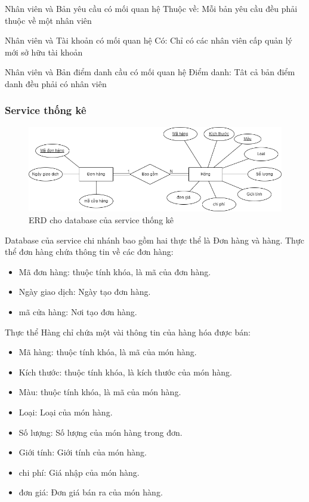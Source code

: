 Nhân viên và Bản yêu cầu có mối quan hệ Thuộc về: Mỗi bản yêu cầu đều phải thuộc về một nhân viên

Nhân viên và Tài khoản có mối quan hệ Có: Chỉ có các nhân viên cấp quản lý mới sở hữu tài khoản

Nhân viên và Bản điểm danh cầu có mối quan hệ Điểm danh: Tât cả bản điểm danh đều phải có nhân viên


\subsubsection{Service thống kê}
\begin{figure}[!htp]
	\begin{center}
		\includegraphics[width=12cm]{img/database/erd/Statistic.png}
		\newline
		\caption{ERD cho database của service thống kê}
	\end{center}
\end{figure}

Database của service chi nhánh bao gồm hai thực thể là Đơn hàng và hàng. Thực thể đơn hàng chứa thông tin về các đơn hàng:
\begin{itemize}
	\item Mã đơn hàng: thuộc tính khóa, là mã của đơn hàng.
	\item Ngày giao dịch: Ngày tạo đơn hàng.
	\item mã cửa hàng: Nơi tạo đơn hàng.
\end{itemize}

Thực thể Hàng chỉ chứa một vài thông tin của hàng hóa được bán:
\begin{itemize}
	\item Mã hàng: thuộc tính khóa, là mã của món hàng.
	\item Kích thước: thuộc tính khóa, là kích thước của món hàng.
	\item Màu: thuộc tính khóa, là mã của món hàng.
	\item Loại: Loại của món hàng.
	\item Số lượng: Số lượng của món hàng trong đơn.
	\item Giới tính: Giới tính của món hàng.
	\item chi phí: Giá nhập của món hàng.
	\item đơn giá: Đơn giá bán ra của món hàng.
\end{itemize}

